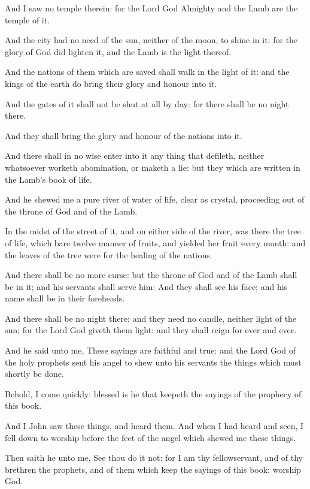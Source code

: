 \Verse And I saw no temple therein: for the Lord God Almighty and the Lamb are the temple of it.

\Verse And the city had no need of the sun, neither of the moon, to shine in it: for the glory of God did lighten it, and the Lamb is the light thereof.

\Verse And the nations of them which are saved shall walk in the light of it: and the kings of the earth do bring their glory and honour into it.

\Verse And the gates of it shall not be shut at all by day: for there shall be no night there.

\Verse And they shall bring the glory and honour of the nations into it.

\Verse And there shall in no wise enter into it any thing that defileth, neither whatsoever worketh abomination, or maketh a lie: but they which are written in the Lamb's book of life.

\Chapter
\Verse And he shewed me a pure river of water of life, clear as crystal, proceeding out of the throne of God and of the Lamb.

\Verse In the midst of the street of it, and on either side of the river, was there the tree of life, which bare twelve manner of fruits, and yielded her fruit every month: and the leaves of the tree were for the healing of the nations.

\Verse And there shall be no more curse: but the throne of God and of the Lamb shall be in it; and his servants shall serve him: \Verse And they shall see his face; and his name shall be in their foreheads.

\Verse And there shall be no night there; and they need no candle, neither light of the sun; for the Lord God giveth them light: and they shall reign for ever and ever.

\Verse And he said unto me, These sayings are faithful and true: and the Lord God of the holy prophets sent his angel to shew unto his servants the things which must shortly be done.

\Verse Behold, I come quickly: blessed is he that keepeth the sayings of the prophecy of this book.

\Verse And I John saw these things, and heard them. And when I had heard and seen, I fell down to worship before the feet of the angel which shewed me these things.

\Verse Then saith he unto me, See thou do it not: for I am thy fellowservant, and of thy brethren the prophets, and of them which keep the sayings of this book: worship God.

